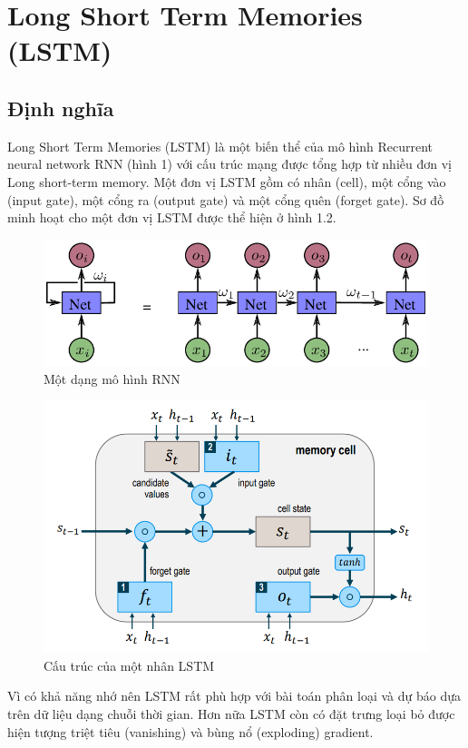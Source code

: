 \section{Long Short Term Memories (LSTM)}
\subsection{Định nghĩa}

Long Short Term Memories (LSTM) là một biến thể của mô hình Recurrent neural network  RNN (hình 1) với cấu trúc mạng được tổng hợp từ nhiều đơn vị Long short-term memory. Một đơn vị LSTM gồm có nhân (cell), một cổng vào (input gate), một cổng ra (output gate) và một cổng quên (forget gate). Sơ đồ minh hoạt cho một đơn vị LSTM được thể hiện ở hình 1.2.

\begin{figure}[!htp]
	\centering
	\includegraphics[scale=.5]{hinhanh/RNN.png}
	\caption{Một dạng mô hình RNN}
\end{figure} 


\begin{figure}[!htp]
	\centering
	\includegraphics[scale=.7]{hinhanh/LSTM.png}
	\caption{Cấu trúc của một nhân LSTM}
\end{figure} 

Vì có khả năng nhớ nên LSTM rất phù hợp với bài toán phân loại và dự báo dựa trên dữ liệu dạng chuỗi thời gian. Hơn nữa LSTM còn có đặt trưng loại bỏ được hiện tượng triệt tiêu (vanishing) và bùng nổ (exploding) gradient.

